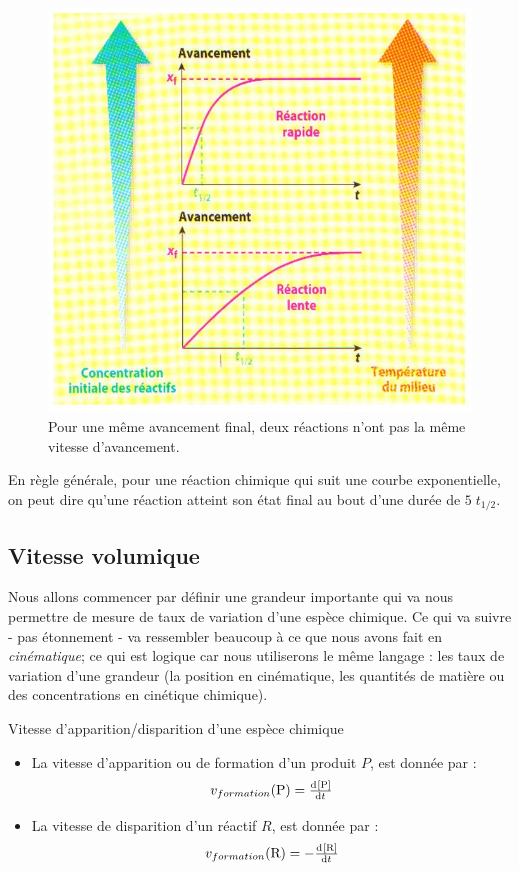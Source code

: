 \documentclass[11pt,a4paper]{article}
\begin{document}
\begin{figure}[h]
    \centering
    \includegraphics[width=0.7\linewidth]{imgs/c4/vitelente.jpg}
    \caption{Pour une même avancement final, deux réactions n'ont pas la même vitesse d'avancement. }
\end{figure}

\begin{rmrq}
En règle générale, pour une réaction chimique qui suit une courbe exponentielle, on peut dire qu'une réaction atteint son état final au bout d'une durée de $5\;t_{1/2} $.
\end{rmrq}
\subsection{Vitesse volumique}

Nous allons commencer par définir une grandeur importante qui va nous permettre de mesure de taux de variation d'une espèce chimique. Ce qui va suivre - pas étonnement - va ressembler beaucoup à ce que nous avons fait en \textit{cinématique}; ce qui est logique car nous utiliserons le même langage : les taux de variation d'une grandeur (la position en cinématique, les quantités de matière ou des concentrations en cinétique chimique). 

\begin{defn}{Vitesse d'apparition/disparition d'une espèce chimique}
\begin{itemize}
    \item La vitesse d'apparition ou de formation d'un produit $P$, est donnée par : 
    \[ v_{formation}(\ce{P}) = \od{\left[\ce{P}\right]}{t}       \]
    \item La vitesse de disparition d'un réactif $R$, est donnée par : 
    \[ v_{formation}(\ce{R}) = - \od{\left[\ce{R}\right]}{t}       \]
\end{itemize}
\end{defn}
\end{document}
